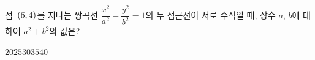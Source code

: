 점~$(6{,}\mkern3mu\mathopen{}4)$를 지나는 쌍곡선 $\dfrac{x^2}{a^2}-\dfrac{y^2}{b^2}=1$의 두 점근선이 서로 수직일 때, 상수 $a$, $b$에 대하여 $a^2+b^2$의 값은?
\begin{choices32}{$20$}{$25$}{$30$}{$35$}{$40$}\end{choices32}
